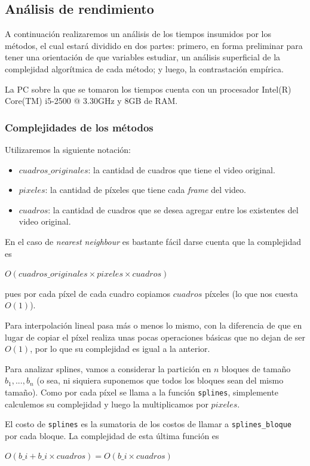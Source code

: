 \subsection{Análisis de rendimiento}
A continuación realizaremos un análisis de los tiempos insumidos por los métodos, el cual estará dividido en dos partes: primero, en forma preliminar para tener una orientación de que variables estudiar, un análisis superficial de la complejidad algorítmica de cada método; y luego, la contrastación empírica.

La PC sobre la que se tomaron los tiempos cuenta con un procesador Intel(R) Core(TM) i5-2500 @ 3.30GHz y 8GB de RAM.

\subsubsection{Complejidades de los métodos}
Utilizaremos la siguiente notación:
\begin{itemize}
	\item $cuadros\_originales$: la cantidad de cuadros que tiene el video original.
	\item $pixeles$: la cantidad de píxeles que tiene cada \emph{frame} del video.
	\item $cuadros$: la cantidad de cuadros que se desea agregar entre los existentes del video original.
\end{itemize}

En el caso de \emph{nearest neighbour} es bastante fácil darse cuenta que la complejidad es 

\begin{center}
	$O(cuadros\_originales \times pixeles \times cuadros)$
\end{center}

pues por cada píxel de cada cuadro copiamos $cuadros$ píxeles (lo que nos cuesta $O(1)$).

Para interpolación lineal pasa más o menos lo mismo, con la diferencia de que en lugar de copiar el píxel realiza unas pocas operaciones básicas que no dejan de ser $O(1)$, por lo que su complejidad es igual a la anterior.

Para analizar splines, vamos a considerar la partición en $n$ bloques de tamaño $b_1,..., b_n$ (o sea, ni siquiera suponemos que todos los bloques sean del mismo tamaño). Como por cada píxel se llama a la función \texttt{splines}, simplemente calculemos su complejidad y luego la multiplicamos por $pixeles$.

El costo de \texttt{splines} es la sumatoria de los costos de llamar a \texttt{splines\_bloque} por cada bloque. La complejidad de esta última función es 
\begin{center}
	$O(b\_i + b\_i \times cuadros) = O(b\_i \times cuadros)$
\end{center}

